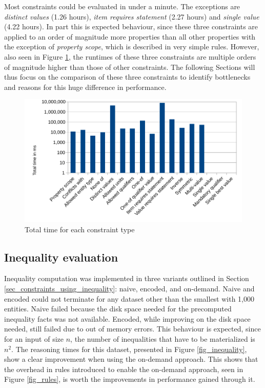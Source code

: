 \documentclass[hyperref,bachelorofscience,fleqn]{cgvpub}
\begin{document}
Most constraints could be evaluated in under a minute. The exceptions are \emph{distinct values} (1.26 hours), \emph{item requires statement} (2.27 hours) and \emph{single value} (4.22 hours). In part this is expected behaviour, since these three constraints are applied to an order of magnitude more properties than all other properties with the exception of \emph{property scope}, which is described in very simple rules. However, also seen in Figure \ref{fig_runtime}, the runtimes of these three constraints are multiple orders of magnitude higher than those of other constraints. The following Sections will thus focus on the comparison of these three constraints to identify bottlenecks and reasons for this huge difference in performance.

\begin{figure}
\includegraphics[width=\linewidth]{images/TotalTime.pdf}
\caption{Total time for each constraint type}\label{fig_runtime}
\end{figure}

\subsection{Inequality evaluation}\label{sec_inequality_evaluation}
Inequality computation was implemented in three variants outlined in Section \ref{sec_constraints_using_inequality}: naive, encoded, and on-demand. Naive and encoded could not terminate for any dataset other than the smallest with 1,000 entities. Naive failed because the disk space needed for the precomputed inequality facts was not available. Encoded, while improving on the disk space needed, still failed due to out of memory errors. This behaviour is expected, since for an input of size \(n\), the number of inequalities that have to be materialized is \(n^2\). The reasoning times for this dataset, presented in Figure \ref{fig_inequality}, show a clear improvement when using the on-demand approach. This shows that the overhead in rules introduced to enable the on-demand approach, seen in Figure \ref{fig_rules}, is worth the improvements in performance gained through it.
\end{document}
